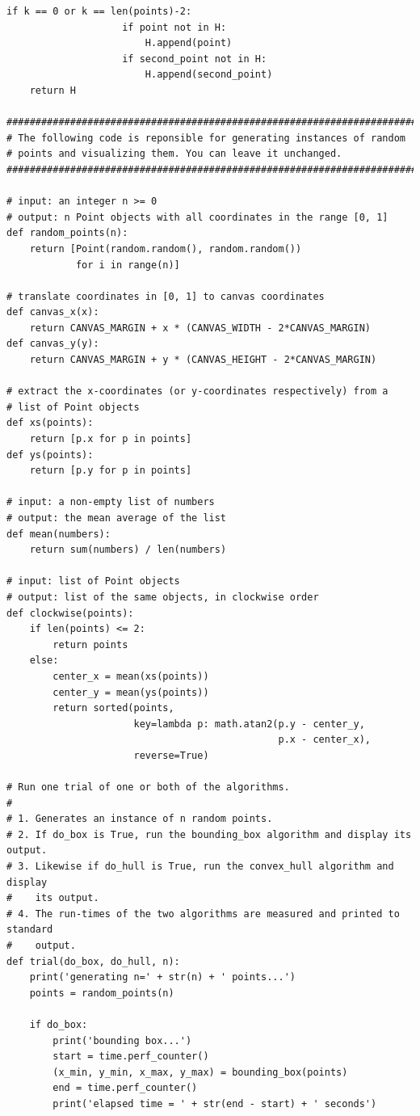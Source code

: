 \documentclass[09pt]{article}
\begin{document}
\begin{lstlisting}[frame=single]
                if k == 0 or k == len(points)-2:
                    if point not in H:
                        H.append(point)
                    if second_point not in H:
                        H.append(second_point)
    return H

##############################################################################
# The following code is reponsible for generating instances of random
# points and visualizing them. You can leave it unchanged.
##############################################################################

# input: an integer n >= 0
# output: n Point objects with all coordinates in the range [0, 1]
def random_points(n):
    return [Point(random.random(), random.random())
            for i in range(n)]

# translate coordinates in [0, 1] to canvas coordinates
def canvas_x(x):
    return CANVAS_MARGIN + x * (CANVAS_WIDTH - 2*CANVAS_MARGIN)
def canvas_y(y):
    return CANVAS_MARGIN + y * (CANVAS_HEIGHT - 2*CANVAS_MARGIN)

# extract the x-coordinates (or y-coordinates respectively) from a
# list of Point objects
def xs(points):
    return [p.x for p in points]
def ys(points):
    return [p.y for p in points]

# input: a non-empty list of numbers
# output: the mean average of the list
def mean(numbers):
    return sum(numbers) / len(numbers)

# input: list of Point objects
# output: list of the same objects, in clockwise order
def clockwise(points):
    if len(points) <= 2:
        return points
    else:
        center_x = mean(xs(points))
        center_y = mean(ys(points))
        return sorted(points,
                      key=lambda p: math.atan2(p.y - center_y,
                                               p.x - center_x),
                      reverse=True)

# Run one trial of one or both of the algorithms.
#
# 1. Generates an instance of n random points.
# 2. If do_box is True, run the bounding_box algorithm and display its output.
# 3. Likewise if do_hull is True, run the convex_hull algorithm and display
#    its output.
# 4. The run-times of the two algorithms are measured and printed to standard
#    output.
def trial(do_box, do_hull, n):
    print('generating n=' + str(n) + ' points...')
    points = random_points(n)

    if do_box:
        print('bounding box...')
        start = time.perf_counter()
        (x_min, y_min, x_max, y_max) = bounding_box(points)
        end = time.perf_counter()
        print('elapsed time = ' + str(end - start) + ' seconds')


\end{lstlisting}
\end{document}
